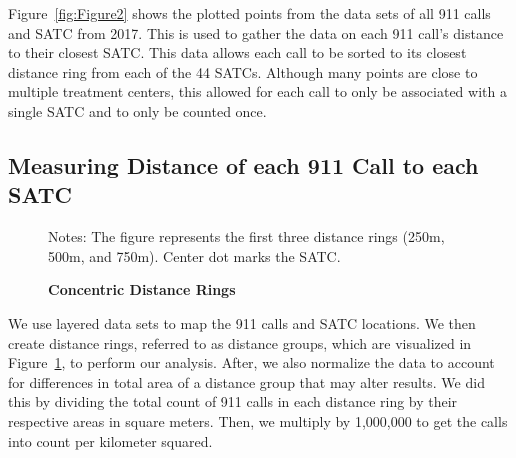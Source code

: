 \documentclass[12pt]{article}
\begin{document}
Figure~\ref{fig:Figure2} shows the plotted points from the data sets of all 911 calls and SATC from 2017. This is used to gather the data on each 911 call's distance to their closest SATC. This data allows each call to be sorted to its closest distance ring from each of the 44 SATCs. Although many points are close to multiple treatment centers, this allowed for each call to only be associated with a single SATC and to only be counted once. 



\subsection{Measuring Distance of each 911 Call to each SATC}
 


\begin{figure} 
\caption{\textbf{Concentric Distance Rings}}
\label{fig:Figure1}
\small{Notes: The figure represents the first three distance rings (250m, 500m, and 750m). Center dot marks the SATC.}
\end{figure}

We use layered data sets to map the 911 calls and SATC locations. We then create distance rings, referred to as distance groups, which are visualized in Figure~\ref{fig:Figure1}, to perform our analysis. After, we also normalize the data to account for differences in total area of a distance group that may alter results. We did this by dividing the total count of 911 calls in each distance ring by their respective areas in square meters. Then, we multiply by 1,000,000 to get the calls into count per kilometer squared.
\end{document}
